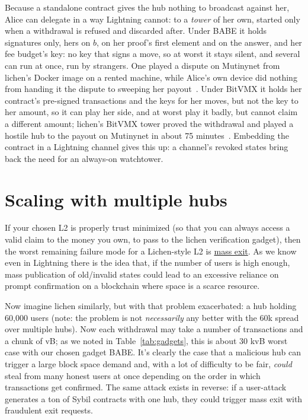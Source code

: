 \documentclass[11pt]{article}
\begin{document}
Because a standalone contract gives the hub nothing to broadcast against
her, Alice can delegate in a way Lightning cannot: to a \emph{tower} of
her own, started only when a withdrawal is refused and discarded after.
Under BABE it holds signatures only, hers on $b$, on her proof's first
element and on the answer, and her fee budget's key: no key that signs a
move, so at worst it stays silent, and several can run at once, run by
strangers. One played a dispute on Mutinynet from lichen's Docker image
on a rented machine, while Alice's own device did nothing from handing it
the dispute to sweeping her payout~\cite[\S 7]{lichenbuilt}. Under BitVMX
it holds her contract's pre-signed transactions and the keys for her
moves, but not the key to her amount, so it can play her side, and at
worst play it badly, but cannot claim a different amount; lichen's
BitVMX tower proved the withdrawal and played a hostile hub to the payout
on Mutinynet in about 75 minutes~\cite[\S 10]{lichenbitvmx}. Embedding
the contract in a Lightning channel gives this up: a channel's revoked
states bring back the need for an always-on watchtower.

\section{Scaling with multiple hubs}
\label{sec:multihub}

If your chosen L2 is properly trust minimized (so that you can always access a valid claim to the money you own, to pass to the lichen verification gadget), then the worst remaining failure mode for a Lichen-style L2 is \underline{mass exit}. As we know even in Lightning there is the idea that, if the number of users is high enough, mass publication of old/invalid states could lead to an excessive reliance on prompt confirmation on a blockchain where space is a scarce resource.

Now imagine lichen similarly, but with that problem exacerbated: a hub holding 60,000 users (note: the problem is not \emph{necessarily} any better with the 60k spread over multiple hubs). Now each withdrawal may take a number of transactions and a chunk of vB; as we noted in Table~\ref{tab:gadgets}, this is about 30 kvB worst case with our chosen gadget BABE. It's clearly the case that a malicious hub can trigger a large block space demand and, with a lot of difficulty to be fair, \emph{could} steal from many honest users at once depending on the order in which transactions get confirmed. The same attack exists in reverse: if a user-attack generates a ton of Sybil contracts with one hub, they could trigger mass exit with fraudulent exit requests.
\end{document}
